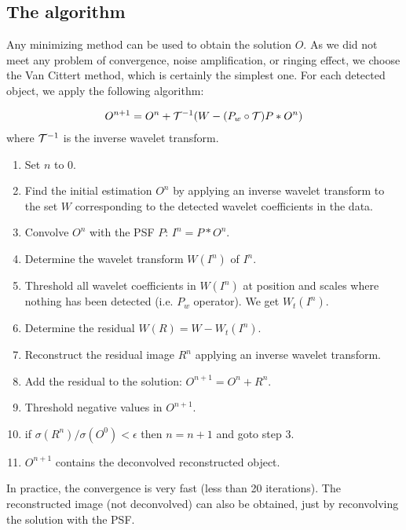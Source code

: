 \subsection{The algorithm}
Any minimizing method can be used to obtain the solution $O$. As we did not
meet any problem of convergence, noise amplification, or ringing effect, 
we choose the Van Cittert method, which is certainly the simplest one.
For each detected object, we apply the following algorithm:

\begin{eqnarray}
O^{n+1} = O^{n} + {\cal T}^{-1}(W - (P_w \circ {\cal T}) P * O^{n})
\end{eqnarray}
where ${\cal T}^{-1}$ is the inverse wavelet transform.

\begin{enumerate}
\item Set $n$ to $0$.  
\item Find the initial estimation $O^{n}$ by applying an inverse
wavelet transform to the set $W$ corresponding to the detected wavelet
coefficients in the data.
\item Convolve $O^{n}$ with the PSF $P$: $I^n = P*O^{n}$.
\item Determine the wavelet transform $W(I^n)$ of $I^n$.
\item Threshold all wavelet coefficients in $W(I^n)$ at position 
and scales where nothing has been detected (i.e. $P_w$ operator). We get
$W_t(I^n)$.
\item Determine the residual $W(R) = W -  W_t(I^n)$.
\item Reconstruct the residual image $R^n$ applying an inverse wavelet
 transform.
\item Add the residual to the solution: $O^{n+1} = O^{n} + R^n$.
\item Threshold negative values in $O^{n+1}$.
\item if $\sigma(R^n) / \sigma(O^0) < \epsilon$ then $n = n + 1$ and goto step 3.
\item $O^{n+1}$ contains the deconvolved reconstructed object. 
\end{enumerate}
In practice, the convergence is very fast (less than 20 iterations).
The reconstructed image (not deconvolved) can also be obtained, just by
reconvolving the solution with the PSF.

\clearpage
\newpage


